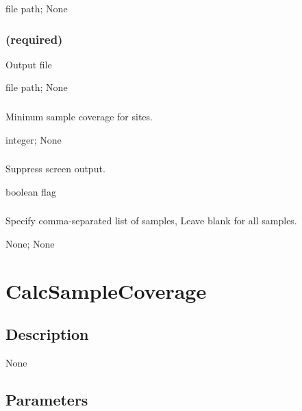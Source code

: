 \documentclass[letterpaper,11pt,english]{sphinxmanual}
\begin{document}
 file path;  None


\subsubsection{ (required)}
\label{\detokenize{prog_desc:id70}}
 Output file

 file path;  None


\subsubsection{}
\label{\detokenize{prog_desc:id71}}
 Mininum sample coverage for sites.

 integer;  None


\subsubsection{}
\label{\detokenize{prog_desc:id72}}
 Suppress screen output.

 boolean flag


\subsubsection{}
\label{\detokenize{prog_desc:id73}}
 Specify comma-separated list of samples, Leave blank for all samples.

 None;  None


\section{CalcSampleCoverage}
\label{\detokenize{prog_desc:calcsamplecoverage}}

\subsection{Description}
\label{\detokenize{prog_desc:id74}}
None


\subsection{Parameters}
\label{\detokenize{prog_desc:id75}}
\end{document}
